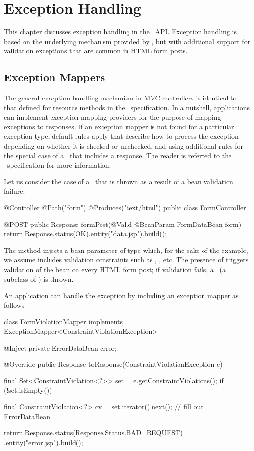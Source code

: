 \chapter{Exception Handling}
\label{exception_handling}

This chapter discusses exception handling in the \mvc\ API. Exception handling is based
on the underlying mechanism provided by \jaxrs, but with additional support for 
validation exceptions that are common in HTML form posts.

\section{Exception Mappers}
\label{exception_mappers}

The general exception handling mechanism in MVC controllers is identical to that defined
for resource methods in the \jaxrs\ specification. In a nutshell, applications can 
implement exception mapping providers for the purpose of mapping exceptions to 
responses. If an exception mapper is not found for a particular exception type, 
default rules apply that describe how to process the exception depending on whether
it is checked or unchecked, and using additional rules for
the special case of a \WebAppExc\ that includes a response. The reader is referred
to the \jaxrs\ specification for more information.

Let us consider the case of a \ConstVioExc\ that is thrown as a result of a bean validation
failure:

\begin{listing}{1}
@Controller
@Path("form")
@Produces("text/html")
public class FormController {

    @POST
    public Response formPost(@Valid @BeanParam FormDataBean form) {
        return Response.status(OK).entity("data.jsp").build();    
    }
}
\end{listing}

The method  injects a bean parameter of type 
which, for the sake of the example, we assume includes validation constraints
such as , , etc. The presence of  triggers
validation of the bean on every HTML form post; if validation fails, a 
\ConstVioExc\ (a subclass of \ValExc) is thrown. 

An application can handle the exception by including an exception mapper as follows:

\begin{listing}{1}
class FormViolationMapper implements 
                          ExceptionMapper<ConstraintViolationException> {

    @Inject
    private ErrorDataBean error;

    @Override
    public Response toResponse(ConstraintViolationException e) {
        final Set<ConstraintViolation<?>> set = e.getConstraintViolations();
        if (!set.isEmpty()) {
            final ConstraintViolation<?> cv = set.iterator().next();
            // fill out ErrorDataBean ...

        }
        return Response.status(Response.Status.BAD_REQUEST)
                       .entity("error.jsp").build();
    }
}
\end{listing}


